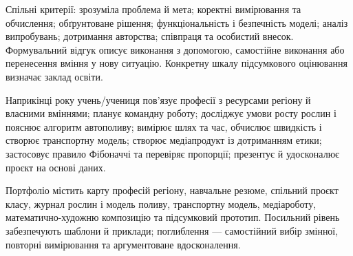 \documentclass[10pt,a4paper,landscape]{article}
\begin{document}
Спільні критерії: зрозуміла проблема й мета; коректні вимірювання та обчислення; обґрунтоване рішення; функціональність і безпечність моделі; аналіз випробувань; дотримання авторства; співпраця та особистий внесок. Формувальний відгук описує виконання з допомогою, самостійне виконання або перенесення вміння у нову ситуацію. Конкретну шкалу підсумкового оцінювання визначає заклад освіти.

Наприкінці року учень/учениця пов’язує професії з ресурсами регіону й власними вміннями; планує командну роботу; досліджує умови росту рослин і пояснює алгоритм автополиву; вимірює шлях та час, обчислює швидкість і створює транспортну модель; створює медіапродукт із дотриманням етики; застосовує правило Фібоначчі та перевіряє пропорції; презентує й удосконалює проєкт на основі даних.

Портфоліо містить карту професій регіону, навчальне резюме, спільний проєкт класу, журнал рослин і модель поливу, транспортну модель, медіароботу, математично-художню композицію та підсумковий прототип. Посильний рівень забезпечують шаблони й приклади; поглиблення — самостійний вибір змінної, повторні вимірювання та аргументоване вдосконалення.
\newpage
\end{document}
